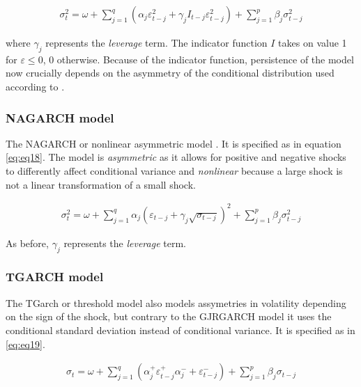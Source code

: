 \documentclass[a4paper, twoside]{templates/ociamthesis}
\begin{document}
\begin{align}
\sigma_t^2 = \omega + \sum\limits_{j=1}^q (\alpha_j \varepsilon_{t-j}^2 + \gamma_j I_{t-j} \varepsilon_{t-j}^2) + \sum\limits_{j = 1}^p \beta_j \sigma_{t-j}^2
 \label{eq:eq17}
\end{align}

\noindent where \(\gamma_j\) represents the \emph{leverage} term. The indicator function \(I\) takes on value 1 for \(\varepsilon \le 0\), 0 otherwise. Because of the indicator function, persistence of the model now crucially depends on the asymmetry of the conditional distribution used according to \textcite{ghalanos2020}.

\hypertarget{nagarch-model}{%
\subsubsection{NAGARCH model}\label{nagarch-model}}

\noindent The NAGARCH or nonlinear asymmetric model \autocite{engle1993}. It is specified as in equation \eqref{eq:eq18}. The model is \emph{asymmetric} as it allows for positive and negative shocks to differently affect conditional variance and \emph{nonlinear} because a large shock is not a linear transformation of a small shock.

\begin{align}
\sigma_t^2 = \omega + \sum\limits_{j=1}^q \alpha_j (\varepsilon_{t-j}+ \gamma_j \sqrt{\sigma_{t-j}})^2 + \sum\limits_{j = 1}^p \beta_j \sigma_{t-j}^2
 \label{eq:eq18}
\end{align}

As before, \(\gamma_j\) represents the \emph{leverage} term.

\hypertarget{tgarch-model}{%
\subsubsection{TGARCH model}\label{tgarch-model}}

\noindent The TGarch or threshold model \autocite{zakoian1994} also models assymetries in volatility depending on the sign of the shock, but contrary to the GJRGARCH model it uses the conditional standard deviation instead of conditional variance. It is specified as in \eqref{eq:eq19}.

\begin{align}
\sigma_t = \omega + \sum\limits_{j=1}^q (\alpha_j^+ \varepsilon_{t-j}^+ \alpha_j^{-} + \varepsilon_{t-j}^{-}) + \sum\limits_{j = 1}^p \beta_j \sigma_{t-j}
 \label{eq:eq19}
\end{align}
\end{document}
